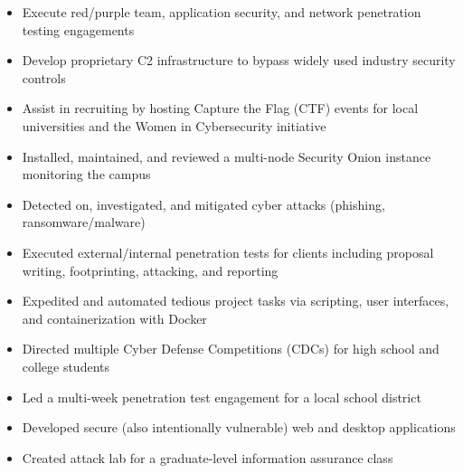 \documentclass[10pt,usletter,ragged2e,withhyper]{altacv}
\begin{document}
\begin{paracol}{2}


\begin{itemize}
\item Execute red/purple team, application security, and network penetration testing engagements
\item Develop proprietary C2 infrastructure to bypass widely used industry security controls
\item Assist in recruiting by hosting Capture the Flag (CTF) events for local universities and the Women in Cybersecurity initiative
\end{itemize}

\divider

\begin{itemize}
\item Installed, maintained, and reviewed a multi-node Security Onion instance monitoring the campus
\item Detected on, investigated, and mitigated cyber attacks (phishing, ransomware/malware)
\end{itemize}

\divider

\begin{itemize}
\item Executed external/internal penetration tests for clients including proposal writing, footprinting, attacking, and reporting
\item Expedited and automated tedious project tasks via scripting, user interfaces, and containerization with Docker
\end{itemize}

\divider

\begin{itemize}
\item Directed multiple Cyber Defense Competitions (CDCs) for high school and college students
\item Led a multi-week penetration test engagement for a local school district
\item Developed secure (also intentionally vulnerable) web and desktop applications
\item Created attack lab for a graduate-level information assurance class
\end{itemize}


\end{paracol}
\end{document}
